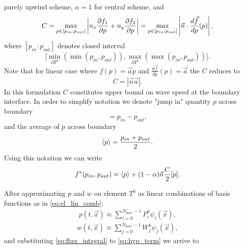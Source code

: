purely upwind scheme, 
$\alpha = 1$ for central scheme,  and
\begin{equation}
C = \max_{p \in [p_{in} : p_{out}]} \left\lvert n_x \frac{\partial f_1}{\partial p} + n_y \frac{\partial f_2}{\partial p}\right\rvert =
\max_{p \in [p_{in} : p_{out}]} \left\lvert\vec{n}\cdot\frac{d\vec{f}}{dp}(p)\right\rvert,
\end{equation}
where $[p_{in} : p_{out}]$ denotes closed interval 
$$\big[\min_{\partial{T^k}} (\min(p_{in}, p_{out})), 
\max_{\partial{T^k}}(\max(p_{in}, p_{out}))\big].$$ 
Note that for linear case where $f(p) = \vec{a}p$ and $\frac{d\vec{f}}{dp}(p) = \vec{a}$  
the $C$ reduces to
\begin{equation}
C = |\vec{n}\vec{a}|.
\end{equation}
In this formulation $C$ constitutes upper bound on wave speed at the boundary interface.
In order to simplify notation we denote "jump in" 
quantity $p$ across boundary 
\begin{equation}
[p] = p_{in} - p_{out},
\end{equation}
and the average of $p$ across boundary  
\begin{equation}
\label{eq:avrg}
\langle p\rangle = \frac{p_{in}+p_{out}}{2}.
\end{equation}
Using this notation we can write
\begin{equation}
f^*(p_{in}, p_{out}) = \langle p\rangle + (1-\alpha) \vec{n}\frac{C}{2}[p].
\end{equation}

After approximating $p$ and $w$ on element $T^k$ as linear combinations of 
basis functions as in \eqref{eq:el_lin_comb}:
\begin{align}
\label{eq:state_epprox}
p(t, \vec{x}) \approx \sum\limits_{i=0}^{N_{base}-1} P_i^k\psi_i(\vec{x}),
\end{align}
\begin{align}
\label{eq:test_approx}
w(t, \vec{x}) \approx \sum\limits_{j=0}^{N_{base}-1} W_j^k\psi_j(\vec{x}),
\end{align}
and substituting \eqref{eq:flux_integral} to \eqref{eq:hyp_term} we arrive to 

